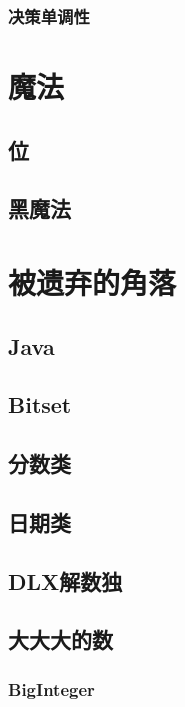 \documentclass{article}
\begin{document}
\subsubsection{决策单调性}


\section{魔法}
\subsection{位}

\subsection{黑魔法}


\section{被遗弃的角落}
\subsection{Java}

\subsection{Bitset}

\subsection{分数类}

\subsection{日期类}

\subsection{DLX解数独}

\subsection{大大大的数}
\subsubsection{BigInteger}

\end{document}
